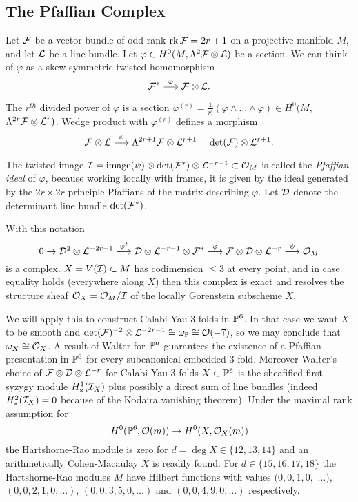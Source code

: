 \subsection{The Pfaffian Complex}
Let ${\mathcal F}$ be a vector bundle of odd rank $\operatorname{rk} {\mathcal F} = 2r+1$ on a projective
manifold $M$, and let ${\mathcal L}$ be a line bundle. Let $\varphi 
\in H^0(M,\Lambda^2 {\mathcal F} \otimes {\mathcal L})$ be a section. We can 
think of $\varphi$ as a skew-symmetric twisted homomorphism
$${\mathcal F}^* \stackrel{\varphi}{\longrightarrow} {\mathcal F} \otimes {\mathcal L}.$$
 
The $r^{th}$ divided power of $\varphi$ is a section
$\varphi^{(r)} = \frac{1}{r!}(\varphi \wedge \dots \wedge \varphi) \in 
H^0(M,$ $\Lambda^{2r}{\mathcal F} \otimes {\mathcal L}^r)$.  Wedge product with $\varphi^{(r)}$ 
defines a morphism 
$$ {\mathcal F} \otimes {\mathcal L} \stackrel{\psi}{\longrightarrow}  \Lambda^{2r+1} {\mathcal F} \otimes {\mathcal L}^{r+1}=\operatorname{det}({\mathcal F})\otimes{\mathcal L}^{r+1}.$$

The  twisted image 
${\mathcal I} = {\rm{image}}(\psi) \otimes \operatorname{det}({\mathcal F}^*) \otimes {\mathcal L}^{-r-1} \subset {\mathcal O}_M$
is called the {\sl Pfaffian ideal} of $\varphi$, because working locally
with frames, it is given by the ideal generated by the  $2r\times 2r$ principle
Pfaffians of the matrix describing $\varphi$.
Let ${\mathcal D}$ denote the determinant line bundle $\operatorname{det}({\mathcal F}^*)$.

\begin{theorem}\label{Pfaffian complex}
With this notation
$$0 \to {\mathcal D}^2\otimes{\mathcal L}^{-2r-1}
\stackrel{\psi^t}{\longrightarrow} {\mathcal D}\otimes{\mathcal L}^{-r-1}\otimes{\mathcal F}^* 
\stackrel{\varphi}{\longrightarrow} {\mathcal F}\otimes{\mathcal D}\otimes{\mathcal L}^{-r} 
\stackrel{\psi}{\longrightarrow} {\mathcal O}_M$$
is a complex. 
$X=V({\mathcal I}) \subset M$ has codimension $\le 3$ at every point, and in case equality
holds (everywhere along $X$) then 
this complex is exact and resolves the structure sheaf ${\mathcal O}_X={\mathcal O}_M/{\mathcal I}$ 
of the  locally Gorenstein subscheme $X$. 
\end{theorem}

We will apply this to construct Calabi-Yau 3-folds in ${\mathbb P}^6$. 
In that case we want $X$ to be smooth and 
$\operatorname{det}({\mathcal F})^{-2}\otimes{\mathcal L}^{-2r-1} \cong \omega_{\mathbb P}\cong {\mathcal O}(-7)$,
so we may conclude that $\omega_X \cong {\mathcal O}_X$. 
A result of Walter \cite{CO:Wa} for ${\mathbb P}^n$ guarantees the existence 
of a Pfaffian presentation in ${\mathbb P}^6$ for every subcanonical embedded 3-fold. 
Moreover Walter's choice of ${\mathcal F}\otimes{\mathcal D}\otimes{\mathcal L}^{-r}$ for Calabi-Yau 3-folds $X \subset {\mathbb P}^6$
is the sheafified first syzygy module $H^1_*({\mathcal I}_X)$ plus possibly 
a direct sum of line bundles 
(indeed $H^2_*({\mathcal I}_X)=0$ because of the Kodaira vanishing theorem). 
Under the maximal rank assumption for
$$H^0({\mathbb P}^6,{\mathcal O}(m)) \to H^0(X,{\mathcal O}_X(m))$$
the Hartshorne-Rao module is zero for $d=\deg X \in \{12,13,14\}$ and 
an arithmetically Cohen-Macaulay $X$ is readily found. 
For $d \in \{15,16,17,18\}$
the Hartshorne-Rao modules $M$ have Hilbert functions with values
$(0,0,1,0,$ $\ldots)$, $(0,0,2,1,0,\ldots)$, $(0,0,3,5,0,\ldots)$ and 
$(0,0,4,9,0,\ldots)$ respectively.

